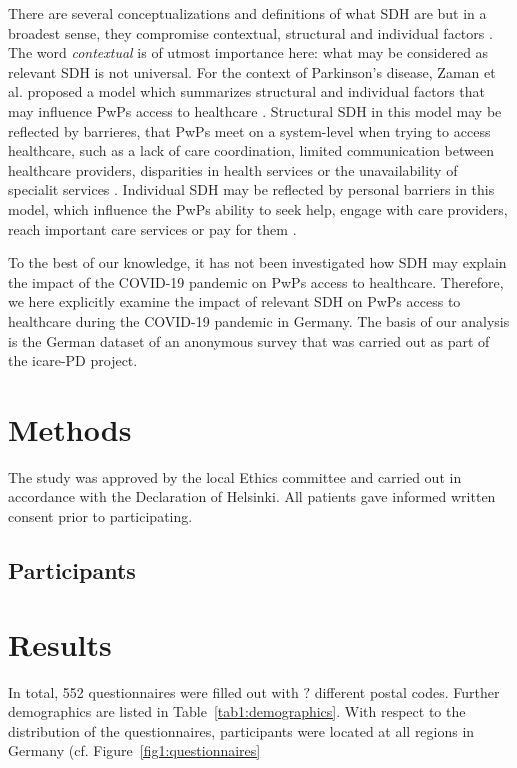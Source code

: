 \documentclass{bmcart}
\begin{document}
	There are several conceptualizations and definitions of what SDH are but in a broadest sense, they compromise contextual, structural and individual factors \cite{world2010conceptual}. The word \textit{contextual} is of utmost importance here: what may be considered as relevant SDH is not universal. For the context of Parkinson's disease, Zaman  et al. proposed a model which summarizes structural and individual factors that may influence PwPs access to healthcare \cite{zaman2021barriers}. 
	Structural SDH in this model may be reflected by barrieres, that PwPs meet on a system-level when trying to access healthcare, such as a lack of care coordination, limited communication between healthcare providers, disparities in health services or the unavailability of specialit services \cite{zaman2021barriers}. Individual SDH may be reflected by personal barriers in this model, which influence the PwPs ability to seek help, engage with care providers, reach important care services or pay for them \cite{zaman2021barriers}. 
	
	To the best of our knowledge, it has not been investigated how SDH may explain the impact of the COVID-19 pandemic on PwPs access to healthcare. Therefore, we here explicitly examine the impact of relevant SDH on PwPs access to healthcare during the COVID-19 pandemic in Germany. The basis of our analysis is the German dataset of an anonymous survey that was carried out as part of the icare-PD project.   
	
\section*{Methods}
The study was approved by the local Ethics committee and carried out in accordance with the Declaration of Helsinki. All patients gave informed written consent prior to participating.

\subsection*{Participants}


\section*{Results}
In total, 552 questionnaires were filled out with $?$ different postal codes. Further demographics are listed in Table~\ref{tab1:demographics}. With respect to the distribution of the questionnaires, participants were located at all regions in Germany (cf. Figure~\ref{fig1:questionnaires}
\end{document}
